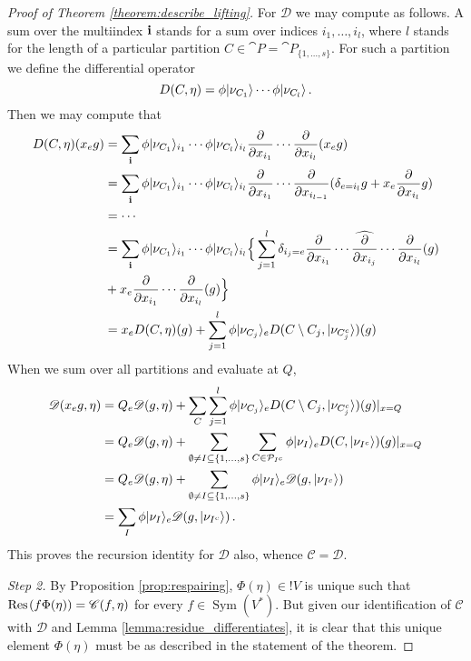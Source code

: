\documentclass[english,letter paper,12pt,reqno]{article}
\DeclarePairedDelimiter\ket{\lvert}{\rangle}
\theoremstyle{example}
\numberwithin{equation}{section}
\DeclareMathOperator{\Sym}{Sym}
\begin{document}
\begin{proof}[Proof of Theorem \ref{theorem:describe_lifting}]
For $\mathscr{D}$ we may compute as follows. A sum over the multiindex $\bold{i}$ stands for a sum over indices $i_1,\ldots,i_l$, where $l$ stands for the length of a particular partition $C \in \cat{P} = \cat{P}_{\{1,\ldots,s\}}$. For such a partition we define the differential operator
\[
D( C, \eta ) = \phi\ket{\nu_{C_1}} \cdots \phi\ket{ \nu_{C_l} }\,.
\]
Then we may compute that
\begin{align*}
D( C, \eta )( x_e g ) &= \sum_{\bold{i}} \phi\ket{\nu_{C_1}}_{i_1} \cdots \phi\ket{\nu_{C_l}}_{i_l} \frac{\partial}{\partial x_{i_1}} \cdots \frac{\partial}{\partial x_{i_l}}( x_e g )\\
&= \sum_{\bold{i}} \phi\ket{\nu_{C_1}}_{i_1} \cdots \phi\ket{\nu_{C_l}}_{i_l} \frac{\partial}{\partial x_{i_1}} \cdots \frac{\partial}{\partial x_{i_{l-1}}}( \delta_{e = i_l} g + x_e \frac{\partial}{\partial x_{i_l}} g )\\
&= \cdots\\
&= \sum_{\bold{i}} \phi\ket{\nu_{C_1}}_{i_1} \cdots \phi\ket{\nu_{C_l}}_{i_l} \Big\{ \sum_{j=1}^l \delta_{i_j = e}  \frac{\partial}{\partial x_{i_1}} \cdots \widehat{ \frac{\partial}{\partial x_{i_j}}} \cdots \frac{\partial}{\partial x_{i_l}}(g)\\
&+ x_e \frac{\partial}{\partial x_{i_1}} \cdots \frac{\partial}{\partial x_{i_l}}(g) \Big\}\\
&= x_e D( C, \eta )(g) + \sum_{j=1}^l \phi \ket{\nu_{C_j}}_e D( C \setminus C_j, \ket{\nu_{C_j^c}} )(g)
\end{align*}
When we sum over all partitions and evaluate at $Q$,
\begin{align*}
\mathscr{D}( x_e g, \eta ) &= Q_e \mathscr{D}( g, \eta ) + \sum_C \sum_{j=1}^l \phi \ket{\nu_{C_j}}_e D( C \setminus C_j, \ket{\nu_{C_j^c}})(g)|_{x = Q}\\
&= Q_e \mathscr{D}( g, \eta ) + \sum_{\emptyset \neq I \subseteq \{1,\ldots,s\}} \sum_{C \in \cat{P}_{I^c}} \phi\ket{\nu_I}_e D( C, \ket{\nu_{I^c}} )(g)|_{x = Q}\\
&= Q_e \mathscr{D}( g, \eta ) + \sum_{\emptyset \neq I \subseteq \{1,\ldots,s\}} \phi \ket{\nu_I}_e \mathscr{D}(g, \ket{\nu_{I^c}})\\
&= \sum_I \phi\ket{\nu_I}_e \mathscr{D}(g, \ket{\nu_{I^c}})\,.
\end{align*}
This proves the recursion identity for $\mathscr{D}$ also, whence $\mathscr{C} = \mathscr{D}$.

\emph{Step 2.} By Proposition \ref{prop:respairing}, $\Phi( \eta ) \in {!}V$ is unique such that $\operatorname{Res}\!\;( f \Phi( \eta ) ) = \mathscr{C}(f, \eta)$ for every $f \in \Sym(V^*)$. But given our identification of $\mathscr{C}$ with $\mathscr{D}$ and Lemma \ref{lemma:residue_differentiates}, it is clear that this unique element $\Phi( \eta )$ must be as described in the statement of the theorem.
\end{proof}
\end{document}
